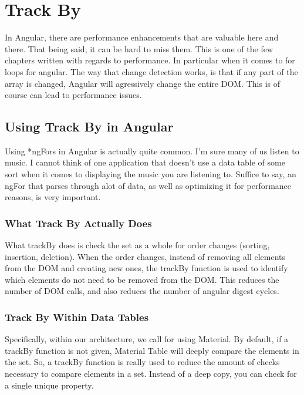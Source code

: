 \section{ Track By }
\maketitle{}

In Angular, there are performance enhancements that are valuable here and there.
That being said, it can be hard to miss them. This is one of the few chapters
written with regards to performance. In particular when it comes to for loops
for angular. The way that change detection works, is that if any part of the
array is changed, Angular will agressively change the entire DOM. This is of
course can lead to performance issues.

\subsection{ Using Track By in Angular }
Using *ngFors in Angular is actually quite common. I'm sure many of us listen
to music. I cannot think of one application that doesn't use a data table of
some sort when it comes to displaying the music you are listening to. Suffice
to say, an ngFor that parses through alot of data, as well as optimizing it for
performance reasons, is very important.

\subsubsection{ What Track By Actually Does }

What trackBy does is check the set as a whole for order changes (sorting,
insertion, deletion). When the order changes, instead of removing all elements
from the DOM and creating new ones, the trackBy function is used to identify
which elements do not need to be removed from the DOM. This reduces the number
of DOM calls, and also reduces the number of angular digest cycles.


\subsubsection{ Track By Within Data Tables }
Specifically, within our architecture, we call for using Material. By default,
if a trackBy function is not given, Material Table will deeply compare the
elements in the set. So, a trackBy function is really used to reduce the amount
of checks necessary to compare elements in a set. Instead of a deep copy, you
can check for a single unique property.
